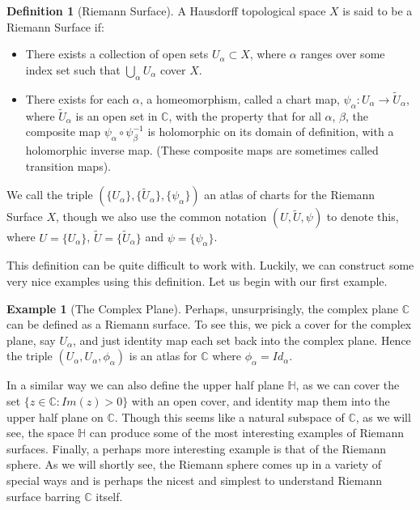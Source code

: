 \documentclass[11pt]{report}
\theoremstyle{definition}
\newtheorem{defn}[thm]{Definition}
\newtheorem{example}[thm]{Example}
\begin{document}
\begin{defn}[Riemann Surface]\label{rsdefn}
A Hausdorff topological space $X$ is said to be a Riemann Surface if:
\begin{itemize}
\item There exists a collection of open sets $U_{\alpha} \subset X$, where
  $
\alpha$ 
ranges over some index set such that $\bigcup\limits_{\alpha} U_{\alpha}$
cover 
$X$.
\item There exists for each $\alpha$, a homeomorphism, called a chart map,
  $ \psi_{\alpha}\colon U_{\alpha} \rightarrow \tilde{U}_{\alpha}$, where
$\tilde{U}_{\alpha}$ is 
  an open set in $\mathbb{C}$, with the property that for all $\alpha$,
  $\beta$, the composite map $\psi_{\alpha} \circ \psi_{\beta}^{-1}$ is
  holomorphic on its domain of definition, with a holomorphic inverse map. (These composite maps are sometimes called transition maps).
\end{itemize}
We call the triple $(\{U_\alpha\},\{\tilde{U}_{\alpha}\},
\{\psi_\alpha\})$ an 
atlas of 
charts for the Riemann Surface $X$, though we also use the common
notation $(U,
\tilde{U}, \psi)$ to denote this, where $U=\{U_\alpha\}$,
$\tilde{U}=\{\tilde{U}
_{\alpha}\}$ and $\psi=\{\psi_\alpha\}$.
\end{defn}
This definition can be quite difficult to work with. Luckily, we can construct some very nice examples using this definition. Let us begin with our first example.
\begin{example}[The Complex Plane]
  Perhaps, unsurprisingly, the complex plane $\mathbb{C}$ can be defined as a Riemann surface. To see this, we pick a cover for the complex plane, say $U_{\alpha}$, and just identity map each set back into the complex plane. Hence the triple $(U_{\alpha},U_{\alpha},\phi_{\alpha})$ is an atlas for $\mathbb{C}$ where $\phi_{\alpha}=Id_{\alpha}$.
\end{example}
In a similar way we can also define the upper half plane $\mathbb{H}$, as we can cover the set $\{ z \in \mathbb{C} \colon Im(z)>0\}$ with an open cover, and identity map them into the upper half plane on $\mathbb{C}$. Though this seems like a natural subspace of $\mathbb{C}$, as we will see, the space $\mathbb{H}$ can produce some of the most interesting examples of Riemann surfaces. Finally, a perhaps more interesting example is that of the Riemann sphere. As we will shortly see, the Riemann sphere comes up in a variety of special ways and is perhaps the nicest and simplest to understand Riemann surface barring $\mathbb{C}$ itself.
\end{document}
